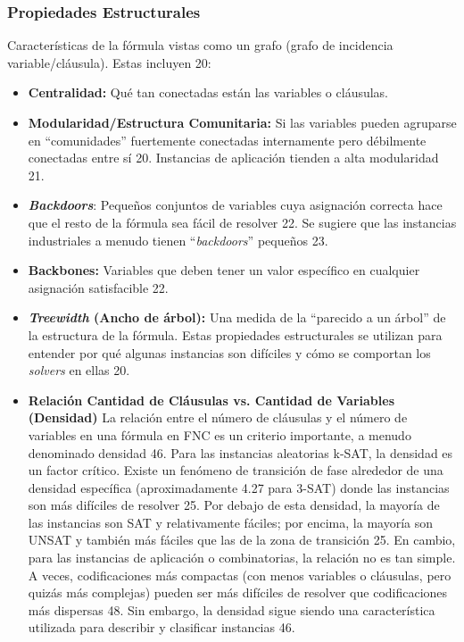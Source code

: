 \subsubsection{Propiedades Estructurales}
Características de la fórmula vistas como un grafo (grafo de incidencia variable/cláusula). Estas incluyen 20:
\begin{itemize}
\item \textbf{Centralidad:} Qué tan conectadas están las variables o cláusulas.
\item \textbf{Modularidad/Estructura Comunitaria:} Si las variables pueden agruparse en ``comunidades'' fuertemente conectadas internamente pero débilmente conectadas entre sí 20. Instancias de aplicación tienden a alta modularidad 21.
\item \textbf{\textit{Backdoors}}: Pequeños conjuntos de variables cuya asignación correcta hace que el resto de la fórmula sea fácil de resolver 22. Se sugiere que las instancias industriales a menudo tienen ``\textit{backdoors}'' pequeños 23.
\item \textbf{Backbones:} Variables que deben tener un valor específico en cualquier asignación satisfacible 22.
\item \textbf{\textit{Treewidth} (Ancho de árbol):} Una medida de la ``parecido a un árbol'' de la estructura de la fórmula.
Estas propiedades estructurales se utilizan para entender por qué algunas instancias son difíciles y cómo se comportan los \textit{solvers} en ellas 20.
\item \textbf{Relación Cantidad de Cláusulas vs. Cantidad de Variables (Densidad)}
La relación entre el número de cláusulas y el número de variables en una fórmula en FNC es un criterio importante, a menudo denominado densidad 46.
Para las instancias aleatorias k-SAT, la densidad es un factor crítico. Existe un fenómeno de transición de fase alrededor de una densidad específica (aproximadamente 4.27 para 3-SAT) donde las instancias son más difíciles de resolver 25. Por debajo de esta densidad, la mayoría de las instancias son SAT y relativamente fáciles; por encima, la mayoría son UNSAT y también más fáciles que las de la zona de transición 25. En cambio, para las instancias de aplicación o combinatorias, la relación no es tan simple. A veces, codificaciones más compactas (con menos variables o cláusulas, pero quizás más complejas) pueden ser más difíciles de resolver que codificaciones más dispersas 48. Sin embargo, la densidad sigue siendo una característica utilizada para describir y clasificar instancias 46.
\end{itemize}





